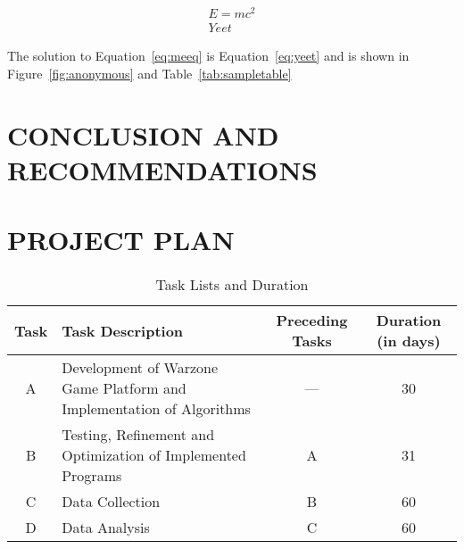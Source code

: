 \documentclass{strrespaper-trad}
\begin{document}
	        \begin{eqnarray}
	            E = mc^2 \label{eq:meeq} \\
	            Yeet \label{eq:yeet}
	        \end{eqnarray}

	        The solution to Equation~\ref{eq:meeq} is Equation~\ref{eq:yeet} and is shown in Figure~\ref{fig:anonymous} and Table~\ref{tab:sampletable} \autocite{al-shemmeri_wind_2010}

    \section{CONCLUSION AND RECOMMENDATIONS}
	    \lipsum[2-4]

    \literaturecited{}

    \appendix

    \section{PROJECT PLAN}
	    \begin{table}[htbp]
	        \centering
	        \caption{Task Lists and Duration}
	        \label{tab:task_lists_duration}
	        \begin{tabularx}{\linewidth}{cXcc}
	            \toprule
	            Task & Task Description                                                      & Preceding Tasks & Duration (in days) \\
	            \midrule
	            A    & Development of Warzone Game Platform and Implementation of Algorithms & ---             & 30                 \\
	            B    & Testing, Refinement and Optimization of Implemented Programs          & A               & 31                 \\
	            C    & Data Collection                                                       & B               & 60                 \\
	            D    & Data Analysis                                                         & C               & 60                 \\
	            \bottomrule
	        \end{tabularx}
	    \end{table}
\end{document}
